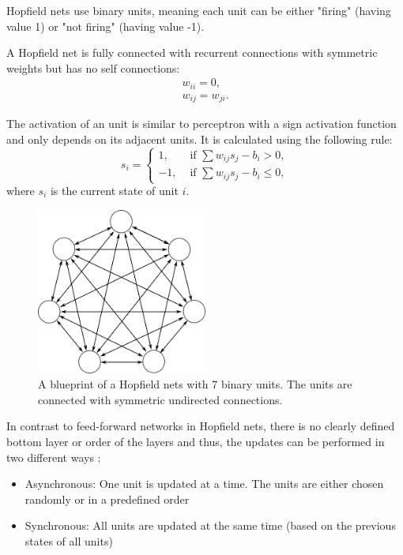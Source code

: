 Hopfield nets use binary units, meaning each unit can be either "firing" (having value 1) or "not firing" (having value -1). 

A Hopfield net is fully connected with recurrent connections with symmetric weights but has no self connections:
\[
\begin{split}
w_{ii} = 0 , \\
w_{ij} = w_{ji} .
\end{split}
\]

The activation of an unit is similar to perceptron with a sign activation function and only depends on its adjacent units. It is calculated using the following rule:
\[
	s_i = 
		\begin{cases}
			1, & \text{  if  } \sum w_{ij} s_{j} - b_{i}> 0 , \\
			-1, & \text{  if  } \sum w_{ij} s_{j} - b_{i} \le 0,
		\end{cases}	
\]
where $s_i$ is the current state of unit $i$.

\begin{figure}
	\centering
    	\includegraphics[width=0.5\textwidth]{imgs/hopfield.png} 
    \caption[A blueprint of a Hopfield nets with 7 binary units.]{A blueprint of a Hopfield nets with 7 binary units. The units are connected with symmetric undirected connections.}
	\label{fig:hopfiled}
\end{figure}


In contrast to feed-forward networks in Hopfield nets, there is no clearly defined bottom layer or order of the layers and thus, the updates can be performed in two different ways :
\begin{itemize}
\item Asynchronous: One unit is updated at a time. The units are either chosen randomly or in a predefined order
\item Synchronous: All units are updated at the same time (based on the previous states of all units)
\end{itemize}

